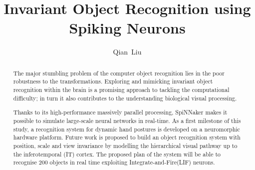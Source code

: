 \documentclass[journal]{journal}
\begin{document}
\title{Invariant Object Recognition using Spiking Neurons}
\author{
Qian~Liu
}%

\maketitle
\thispagestyle{empty}

\begin{abstract}
The major stumbling problem of the computer object recognition lies in the poor robustness to the transformations.
Exploring and mimicking invariant object recognition within the brain is a promising approach to tackling the computational difficulty;
in turn it also contributes to the understanding biological visual processing. %

Thanks to its high-performance massively parallel processing, SpiNNaker makes it possible to simulate large-scale neural networks in real-time.
As a first milestone of this study, a recognition system for dynamic hand postures is developed on a neuromorphic hardware platform.
Future work is proposed to build an object recognition system with position, scale and view invariance by modelling the hierarchical visual pathway up to the inferotemporal (IT) cortex.
The proposed plan of the system will be able to recognise 200 objects in real time exploiting Integrate-and-Fire(LIF) neurons.
\end{abstract}

\end{document}
